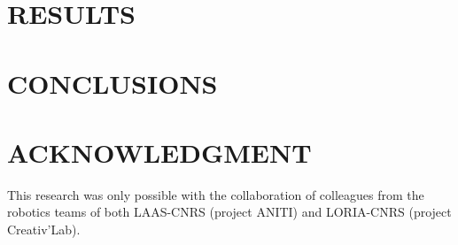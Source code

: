 \documentclass[letterpaper, 10 pt, conference]{ieeeconf}  %
\begin{document}
	\section{RESULTS}
	\label{sec:results}

	\section{CONCLUSIONS}
	\label{sec:conclusions}
	
	
	\addtolength{\textheight}{-12cm}   %
	
	
	
	
	
	
	
	
	
	\section*{ACKNOWLEDGMENT}
	
	This research was only possible with the collaboration of colleagues from the robotics teams of both LAAS-CNRS (project ANITI) and LORIA-CNRS (project Creativ’Lab).
	
	
	
	
	
	
		
	
	
	
\end{document}
